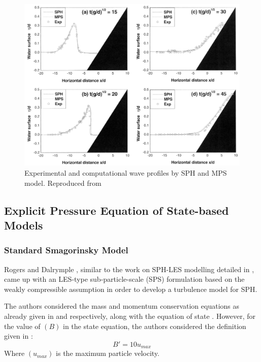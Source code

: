 \begin{figure}[H]
    \centering
    \includegraphics[scale=0.6]{Figures/research_papers/shao2005-wave-profile-result.png}
    \caption{Experimental and computational wave profiles by SPH and MPS model. Reproduced from \cite{Shao2005}}
    \label{fig:shao2005-wave-profile-result}
\end{figure}


\subsection{Explicit Pressure Equation of State-based Models}
\subsubsection{Standard Smagorinsky Model}

Rogers and Dalrymple \parencite{ROGERS2005}, similar to the work on SPH-LES modelling detailed in , came up with an LES-type sub-particle-scale (SPS) formulation based on the weakly compressible assumption in order to develop a turbulence model for SPH.

The authors considered the mass and momentum conservation equations as already given in  and   respectively, along with the equation of state . However, for the value of $(B)$ in the state equation, the authors considered the definition given in :
\begin{equation}
    B' = 10 u_{max}
    \label{eq:ROGERS2005-eos-b}
\end{equation}
Where $(u_{max})$ is the maximum particle velocity.


